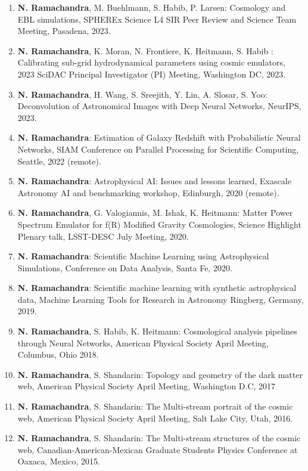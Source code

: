 \documentclass[letterpaper]{article}
\begin{document}
\begin{enumerate}
\item \textbf{N. Ramachandra}, M. Buehlmann, S. Habib, P. Larsen: Cosmology and EBL simulations, SPHEREx Science L4 SIR Peer Review and Science Team Meeting, Pasadena, 2023.

\item \textbf{N. Ramachandra}, K. Moran, N. Frontiere, K. Heitmann, S. Habib : Calibrating sub-grid hydrodynamical parameters
using cosmic emulators, 2023 SciDAC Principal Investigator (PI) Meeting, Washington DC, 2023.


\item \textbf{N. Ramachandra}, H. Wang, S. Sreejith, Y. Lin, A. Slosar, S. Yoo: Deconvolution of Astronomical Images with Deep Neural Networks, NeurIPS, 2023.

\item \textbf{N. Ramachandra}: Estimation of Galaxy Redshift with Probabilistic Neural Networks, SIAM Conference on Parallel Processing for Scientific Computing, Seattle, 2022 (remote).


\item \textbf{N. Ramachandra}: Astrophysical AI: Issues and lessons learned, Exascale Astronomy AI and benchmarking workshop, Edinburgh, 2020 (remote).  

\item \textbf{N. Ramachandra}, G. Valogiannis, M. Ishak, K. Heitmann: Matter Power Spectrum Emulator for f(R) Modified Gravity Cosmologies, Science Highlight Plenary talk, LSST-DESC July Meeting, 2020. 

\item \textbf{N. Ramachandra}: Scientific Machine Learning using Astrophysical Simulations, Conference on Data Analysis, Santa Fe, 2020.

\item \textbf{N. Ramachandra}: Scientific machine learning with synthetic astrophysical data, Machine Learning Tools for Research in Astronomy Ringberg, Germany, 2019.

\item \textbf{N. Ramachandra}, S. Habib, K. Heitmann: Cosmological analysis pipelines through Neural Networks, American Physical Society April Meeting, Columbus, Ohio 2018.

\item \textbf{N. Ramachandra}, S. Shandarin: Topology and geometry of the dark matter web, American Physical Society April Meeting, Washington D.C, 2017

\item \textbf{N. Ramachandra}, S. Shandarin: The Multi-stream portrait of the cosmic web, American Physical Society April Meeting, Salt Lake City, Utah, 2016. 

\item \textbf{N. Ramachandra}, S. Shandarin: The Multi-stream structures of the cosmic web, Canadian-American-Mexican Graduate Students Physics Conference at Oaxaca, Mexico, 2015.

\end{enumerate}
\end{document}
